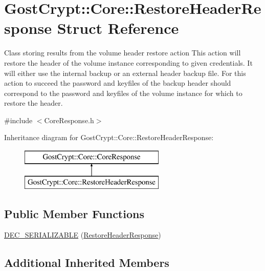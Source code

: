 \hypertarget{struct_gost_crypt_1_1_core_1_1_restore_header_response}{}\section{Gost\+Crypt\+:\+:Core\+:\+:Restore\+Header\+Response Struct Reference}
\label{struct_gost_crypt_1_1_core_1_1_restore_header_response}


Class storing results from the volume header restore action This action will restore the header of the volume instance corresponding to given credentials. It will either use the internal backup or an external header backup file. For this action to succeed the password and keyfiles of the backup header should correspond to the password and keyfiles of the volume instance for which to restore the header.  




{\ttfamily \#include $<$Core\+Response.\+h$>$}

Inheritance diagram for Gost\+Crypt\+:\+:Core\+:\+:Restore\+Header\+Response\+:\begin{figure}[H]
\begin{center}
\leavevmode
\includegraphics[height=2.000000cm]{struct_gost_crypt_1_1_core_1_1_restore_header_response}
\end{center}
\end{figure}
\subsection*{Public Member Functions}
\begin{DoxyCompactItemize}
\item 
\hyperlink{struct_gost_crypt_1_1_core_1_1_restore_header_response_a9f6d531584a450e5f5c2767d4b78cfa6}{D\+E\+C\+\_\+\+S\+E\+R\+I\+A\+L\+I\+Z\+A\+B\+LE} (\hyperlink{struct_gost_crypt_1_1_core_1_1_restore_header_response}{Restore\+Header\+Response})
\end{DoxyCompactItemize}
\subsection*{Additional Inherited Members}


